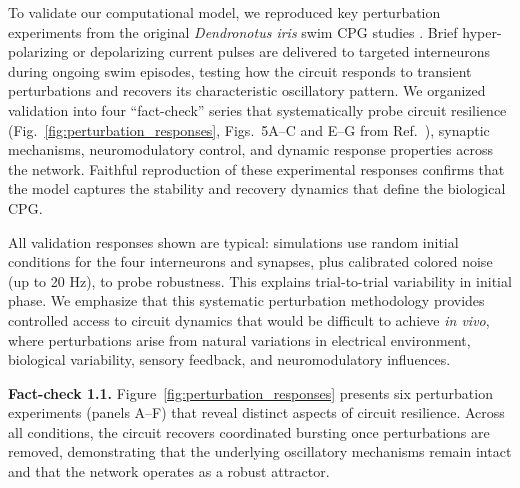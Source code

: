 \documentclass[nofootinbib,aip,amsmath,amssymb,preprint,twocolumn,floatfix,10pt]{revtex4-2}
\begin{document}
To validate our computational model, we reproduced key perturbation experiments from the original \textit{Dendronotus iris} swim CPG studies \cite{SakuraiKatz2016}. Brief hyper-polarizing or depolarizing current pulses are delivered to targeted interneurons during ongoing swim episodes, testing how the circuit responds to transient perturbations and recovers its characteristic oscillatory pattern. We organized validation into four ``fact-check'' series that systematically probe circuit resilience (Fig.~\ref{fig:perturbation_responses}, Figs.~5A--C and E--G from Ref.~\cite{SakuraiKatz2016}), synaptic mechanisms, neuromodulatory control, and dynamic response properties across the network. Faithful reproduction of these experimental responses confirms that the model captures the stability and recovery dynamics that define the biological CPG.

All validation responses shown are typical: simulations use random initial conditions for the four interneurons and synapses, plus calibrated colored noise (up to 20 Hz), to probe robustness. This explains trial-to-trial variability in initial phase. We emphasize that this systematic perturbation methodology provides controlled access to circuit dynamics that would be difficult to achieve \textit{in vivo}, where perturbations arise from natural variations in electrical environment, biological variability, sensory feedback, and neuromodulatory influences.


{\bf Fact-check 1.1.}
Figure~\ref{fig:perturbation_responses} presents six perturbation experiments (panels A--F) that reveal distinct aspects of circuit resilience. Across all conditions, the circuit recovers coordinated bursting once perturbations are removed, demonstrating that the underlying oscillatory mechanisms remain intact and that the network operates as a robust attractor.
\end{document}
